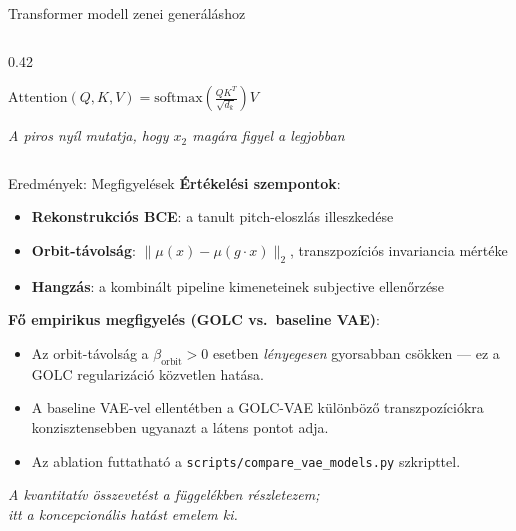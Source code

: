 \documentclass[aspectratio=169]{beamer}
\begin{document}
\begin{frame}{Transformer modell zenei generáláshoz}
\begin{columns}[T]
\begin{column}{0.42\textwidth}
\begin{center}

\vspace{0.5em}
\small
$\text{Attention}(Q,K,V) = \text{softmax}\left(\frac{QK^T}{\sqrt{d_k}}\right)V$

\vspace{0.5em}
\textit{A piros nyíl mutatja, hogy $x_2$ magára figyel a legjobban}
\end{center}
\end{column}
\end{columns}
\end{frame}

\begin{frame}{Eredmények: Megfigyelések}
\textbf{Értékelési szempontok}:
\begin{itemize}
    \item \textbf{Rekonstrukciós BCE}: a tanult pitch-eloszlás illeszkedése
    \item \textbf{Orbit-távolság}: $\|\mu(x) - \mu(g \cdot x)\|_2$, transzpozíciós invariancia mértéke
    \item \textbf{Hangzás}: a kombinált pipeline kimeneteinek subjective ellenőrzése
\end{itemize}

\vspace{0.5em}
\textbf{Fő empirikus megfigyelés (GOLC vs.\ baseline VAE)}:
\begin{itemize}
    \item Az orbit-távolság a $\beta_{\text{orbit}} > 0$ esetben \emph{lényegesen} gyorsabban csökken --- ez a GOLC regularizáció közvetlen hatása.
    \item A baseline VAE-vel ellentétben a GOLC-VAE különböző transzpozíciókra konzisztensebben ugyanazt a látens pontot adja.
    \item Az ablation futtatható a \texttt{scripts/compare\_vae\_models.py} szkripttel.
\end{itemize}

\vspace{0.5em}
\begin{center}
\textit{A kvantitatív összevetést a függelékben részletezem;\\itt a koncepcionális hatást emelem ki.}
\end{center}
\end{frame}
\end{document}
